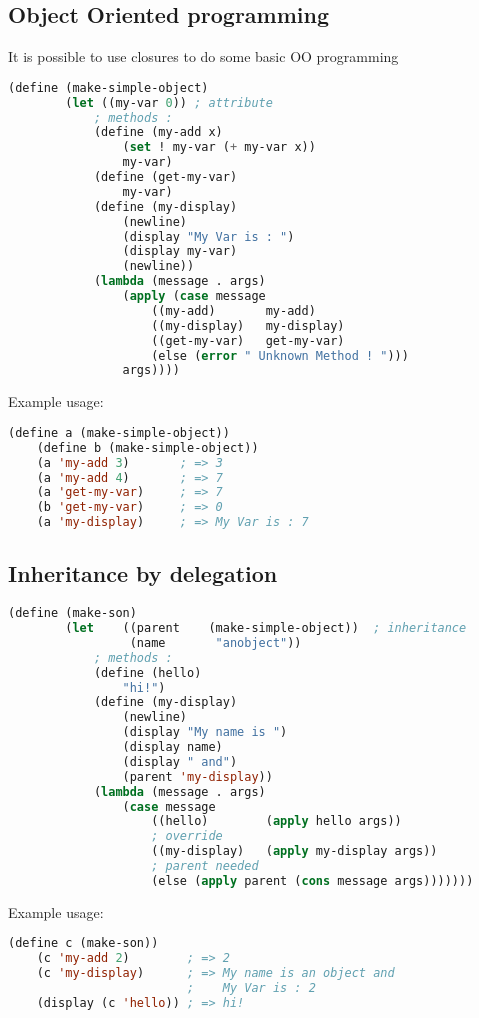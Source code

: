\subsection{Object Oriented programming}
It is possible to use closures to do some basic OO programming
\begin{lstlisting}[language=Lisp]
    (define (make-simple-object)
        (let ((my-var 0)) ; attribute
            ; methods :
            (define (my-add x)
                (set ! my-var (+ my-var x))
                my-var)
            (define (get-my-var)
                my-var)
            (define (my-display)
                (newline)
                (display "My Var is : ")
                (display my-var)
                (newline))
            (lambda (message . args)
                (apply (case message
                    ((my-add)       my-add)
                    ((my-display)   my-display)
                    ((get-my-var)   get-my-var)
                    (else (error " Unknown Method ! ")))
                args))))
\end{lstlisting}
Example usage:
\begin{lstlisting}[language=Lisp]
    (define a (make-simple-object))
    (define b (make-simple-object))
    (a 'my-add 3)       ; => 3
    (a 'my-add 4)       ; => 7
    (a 'get-my-var)     ; => 7
    (b 'get-my-var)     ; => 0
    (a 'my-display)     ; => My Var is : 7
\end{lstlisting}

\subsection{Inheritance by delegation}
\begin{lstlisting}[language=Lisp]
    (define (make-son)
        (let    ((parent    (make-simple-object))  ; inheritance
                 (name       "anobject"))          
            ; methods :
            (define (hello)
                "hi!")
            (define (my-display)
                (newline)
                (display "My name is ")
                (display name)
                (display " and")
                (parent 'my-display))
            (lambda (message . args)
                (case message
                    ((hello)        (apply hello args))
                    ; override
                    ((my-display)   (apply my-display args))
                    ; parent needed
                    (else (apply parent (cons message args)))))))
\end{lstlisting}
Example usage:
\begin{lstlisting}[language=Lisp]
    (define c (make-son))
    (c 'my-add 2)        ; => 2
    (c 'my-display)      ; => My name is an object and
                         ;    My Var is : 2
    (display (c 'hello)) ; => hi!
\end{lstlisting}


